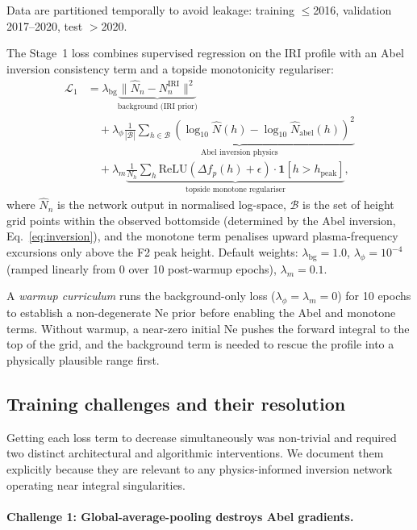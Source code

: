 \documentclass[11pt,twocolumn]{article}
\begin{document}
Data are partitioned temporally to avoid leakage: training $\leq$2016,
validation 2017--2020, test $>$2020.

The Stage~1 loss combines supervised regression on the IRI profile with an
Abel inversion consistency term and a topside monotonicity regulariser:
\begin{align}
  \mathcal{L}_1 &=
  \lambda_\text{bg}\underbrace{\|\hat{N}_n - N_n^\text{IRI}\|^2}_{\text{background (IRI prior)}}
  \nonumber\\
  &\quad+ \lambda_\phi\underbrace{
      \frac{1}{|\mathcal{B}|}\sum_{h\in\mathcal{B}}
      \!\left(\log_{10}\hat{N}(h) - \log_{10}\hat{N}_\text{abel}(h)\right)^2
    }_{\text{Abel inversion physics}} \nonumber\\
  &\quad+ \lambda_m\underbrace{
      \frac{1}{N_h}\sum_h \text{ReLU}\!\left(\Delta f_p(h) + \epsilon\right)
      \cdot \mathbf{1}[h > h_\text{peak}]
    }_{\text{topside monotone regulariser}},
  \label{eq:loss1}
\end{align}
where $\hat{N}_n$ is the network output in normalised log-space,
$\mathcal{B}$ is the set of height grid points within the observed bottomside
(determined by the Abel inversion, Eq.~\ref{eq:inversion}),
and the monotone term penalises upward plasma-frequency excursions only above the
F2 peak height.
Default weights: $\lambda_\text{bg}=1.0$,
$\lambda_\phi=10^{-4}$ (ramped linearly from 0 over 10 post-warmup epochs),
$\lambda_m=0.1$.

A \emph{warmup curriculum} runs the background-only loss ($\lambda_\phi =
\lambda_m = 0$) for 10 epochs to establish a non-degenerate Ne prior before
enabling the Abel and monotone terms.
Without warmup, a near-zero initial Ne pushes the forward integral to the top of
the grid, and the background term is needed to rescue the profile into a
physically plausible range first.

\subsection{Training challenges and their resolution}

Getting each loss term to decrease simultaneously was non-trivial and required
two distinct architectural and algorithmic interventions.
We document them explicitly because they are relevant to any physics-informed
inversion network operating near integral singularities.

\paragraph{Challenge 1: Global-average-pooling destroys Abel gradients.}
\end{document}
